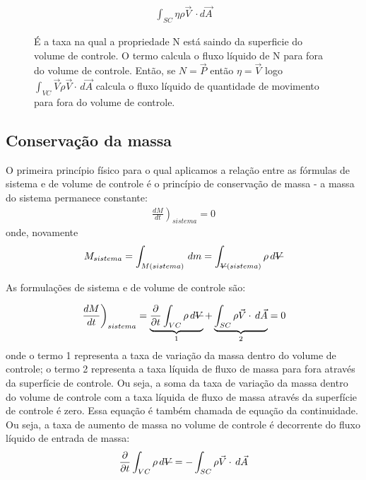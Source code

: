 \documentclass{article}
\newcommand{\stkout}[1]{\ifmmode\text{\sout{\ensuremath{#1}}}\else\sout{#1}\fi}
\begin{document}
\begin{figure}[!h]
  \centering
  \begin{minipage}{0.45\textwidth}
    \begin{align*}
      \int_{SC}^{ } \eta \rho \vec{V}\ \cdot d\vec{A}
    \end{align*}
  \end{minipage}\hfill
  \begin{minipage}{0.45\textwidth}
    É a taxa na qual a propriedade N está saindo da superficie do volume de controle. O termo calcula o fluxo líquido de N para fora do volume de controle. Então, se $N=\vec{P}$ então $\eta=\vec{V}$ logo $\int_{VC}^{ } \vec{V} \rho \vec{V} \cdot\, d\vec{A}$ calcula o fluxo líquido de quantidade de movimento para fora do volume de controle.
  \end{minipage}
\end{figure}

\subsection{Conservação da massa}
O primeira princípio físico para o qual aplicamos a relação entre as fórmulas de sistema e de volume de controle é o princípio de conservação de massa - a massa do sistema permanece constante:
\begin{align*}
  \left.\frac{dM}{dt}\right)_{sistema}=0
\end{align*}
onde, novamente
\begin{align*}
  M_{sistema}=\int_{M(sistema)}^{ } \, dm = \int_{\stkout{V}(sistema)}^{ } \rho\, d\stkout{V}
\end{align*}

As formulações de sistema e de volume de controle são:

\begin{equation}
  \left.\frac{dM}{dt}\right)_{sistema}=\underbrace{\frac{\partial}{\partial t}\int_{VC}^{ } \rho \, d\stkout{V}}_{\text{1}} + \underbrace{\int_{SC}^{ } \rho \vec{V} \cdot \, d\vec{A}}_{2} = 0
  \label{eq:conservacaoDeMassaFormulacao}
\end{equation}
onde o termo 1 representa a taxa de variação da massa dentro do volume de controle; o termo 2 representa a taxa líquida de fluxo de massa para fora através da superfície de controle.
 Ou seja, a soma da taxa de variação da massa dentro do volume de controle com a taxa líquida de fluxo de massa através da superfície de controle é zero. Essa equação é também chamada de equação da continuidade. Ou seja, a taxa de aumento de massa no volume de controle é decorrente do fluxo líquido de entrada de massa:
\begin{align*}
  \frac{\partial}{\partial t}\int_{VC}^{ } \rho \, d\stkout{V} = -\int_{SC}^{ } \rho \vec{V} \cdot \, d\vec{A}
\end{align*}
\end{document}
